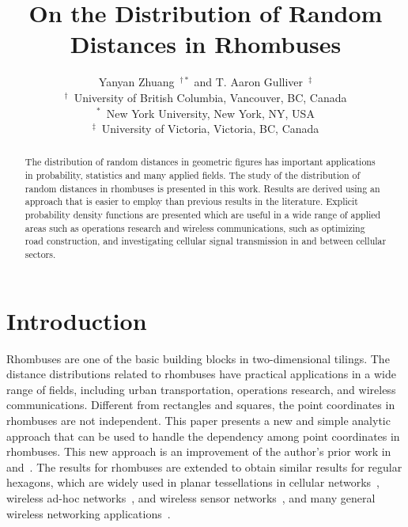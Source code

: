 \documentclass[12pt,draftclsnofoot,onecolumn]{IEEEtran}
\begin{document}
\title{On the Distribution of Random\\Distances in Rhombuses}

\author{Yanyan Zhuang~$^{\dagger *}$ and T. Aaron Gulliver~$^\ddagger$\\
$^\dagger$~University of British Columbia, Vancouver, BC, Canada\\
$^*$~New York University, New York, NY, USA\\
$^\ddagger$~University of Victoria, Victoria, BC, Canada}

\maketitle
\thispagestyle{empty}

\begin{abstract}
The distribution of random distances in geometric figures has important
applications in probability, statistics and many applied fields.
The study of the distribution of random distances in rhombuses is presented
in this work. Results are derived using an approach that is easier to
employ than previous results in the literature. Explicit
probability density functions are presented which are useful in a wide range of applied
areas such as operations research and wireless communications, such as 
optimizing road construction, and investigating cellular signal transmission in 
and between cellular sectors.
\end{abstract}

\section{Introduction}
Rhombuses are one of the basic building blocks in two-dimensional tilings. The
distance distributions related to rhombuses have practical applications in a
wide range of fields, including urban transportation, operations research, and wireless communications.
Different from rectangles and squares, the point coordinates in rhombuses are
not independent. This paper presents a new and simple analytic approach that can be used
to handle the dependency among point coordinates in rhombuses. This new approach
is an improvement of the author's prior work in~\cite{zhuang2011random}
and~\cite{zhuang2012geometrical}. The results for rhombuses are extended
to obtain similar results for regular hexagons, which
are widely used in planar tessellations in cellular
networks~\cite{zhuang2011geometric}, wireless ad-hoc
networks~\cite{zhuang2013planar}, and wireless sensor
networks~\cite{schwiebert2001research, chang2008hexagonal, wang2009analytical},
and many general wireless networking applications~\cite{baltzis2012distance}.
\end{document}
